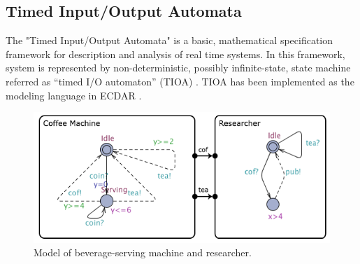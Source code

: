 

\subsection{Timed Input/Output Automata}
\label{background-tioa}

The "Timed Input/Output Automata" is a basic, mathematical specification
framework for description and analysis of real time systems.  In this framework,
system is represented by non-deterministic, possibly infinite-state, state
machine referred as “timed I/O automaton” (TIOA)
\cite{Kaynar:2006:TTI:1203437}. TIOA has been implemented as the modeling
language in ECDAR \cite{conf/atva/DavidLLNW10}.

\begin{figure}[t]
\label{simple-model}
\begin{centering}
\includegraphics[scale=0.6]{images/simplefied_uni}
\par\end{centering}
\caption{Model of beverage-serving machine and researcher.}
\label{bev-machine}
\end{figure}

